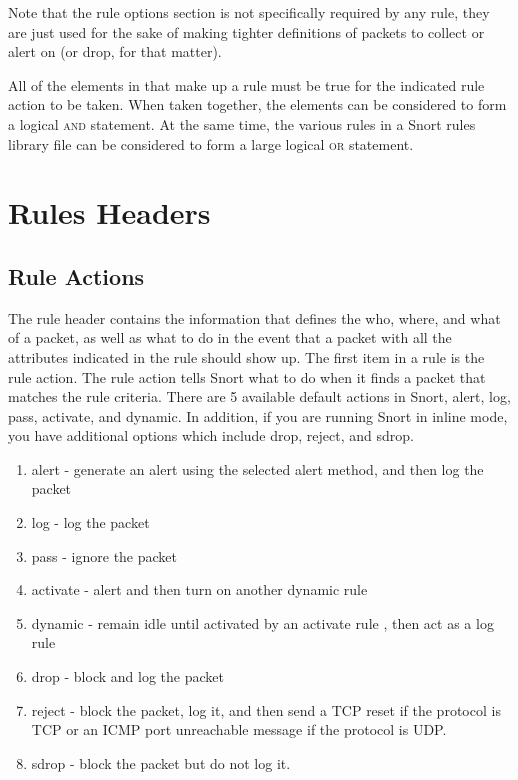 \documentclass[english]{report}
\newenvironment{note}{
\samepage
    \vspace{10pt}{\textsf{
        {\hspace{7pt}\Huge{$\triangle$\hspace{-12.5pt}{\Large{$^!$}}}}\hspace{5pt}
        {\Large{NOTE}}
    }
    }
   \begin{center}
    \par\vspace{-17pt}

    \begin{lrbox}{\savepar}
    \begin{minipage}[r]{6in}
}
{
    \end{minipage}
    \end{lrbox}
    \fbox{
        \usebox{
            \savepar
	}
    }
    \par\vskip10pt
    \end{center}
}
\newenvironment{note}{
        \begin{rawhtml}
        <p><table border="1"><tr><td><b>
        Note:&nbsp;&nbsp;</b>
        \end{rawhtml}
}{
        \begin{rawhtml}
        </b></td></tr></table></p>
        \end{rawhtml}
}
\begin{document}
\begin{note}

Note that the rule options section is not specifically required by any rule,
they are just used for the sake of making tighter definitions of packets to
collect or alert on (or drop, for that matter). 

\end{note}

All of the elements in that make up a rule must be true for the indicated rule
action to be taken. When taken together, the elements can be considered to form
a logical \textsc{and} statement. At the same time, the various rules in a
Snort rules library file can be considered to form a large logical \textsc{or}
statement. 

\section{Rules Headers}

\subsection{Rule Actions}
\label{rules action section}

The rule header contains the information that defines the who, where, and what
of a packet, as well as what to do in the event that a packet with all the
attributes indicated in the rule should show up. The first item in a rule is
the rule action. The rule action tells Snort what to do when it finds a packet
that matches the rule criteria. There are 5 available default actions in Snort,
alert, log, pass, activate, and dynamic. In addition, if you are running Snort
in inline mode, you have additional options which include drop, reject, and
sdrop. 

\begin{enumerate}

\item alert - generate an alert using the selected alert method, and then
log the packet 

\item log - log the packet 

\item pass - ignore the packet 

\item activate - alert and then turn on another dynamic rule  

\item dynamic - remain idle until activated by an activate rule , then act as a
log rule

\item drop - block and log the packet

\item reject - block the packet, log it, and then send a TCP reset
if the protocol is TCP or an ICMP port unreachable message if the protocol is
UDP.

\item sdrop - block the packet but do not log it.

\end{enumerate}
\end{document}

